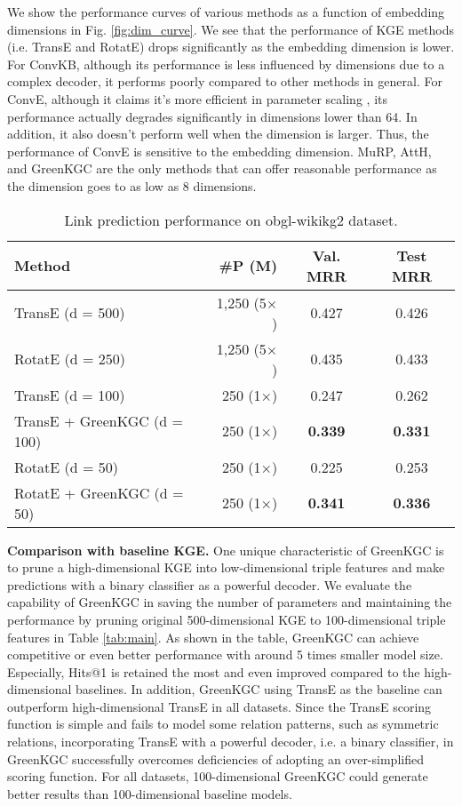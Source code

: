 \documentclass{article}
\begin{document}
We show the performance curves of various methods as a function of
embedding dimensions in Fig. \ref{fig:dim_curve}. We see that the
performance of KGE methods (i.e. TransE and RotatE) drops significantly 
as the embedding dimension is lower. For ConvKB, although its
performance is less influenced by dimensions due to a complex decoder, 
it performs poorly compared to other methods in general. For ConvE, although
it claims it's more efficient in parameter scaling 
\citep{dettmers2018convolutional}, its performance actually degrades 
significantly in dimensions lower than 64. In addition, it also doesn't
perform well when the dimension is larger. Thus, the performance of ConvE is 
sensitive to the embedding dimension. 
MuRP, AttH, and GreenKGC are the only methods that can offer 
reasonable performance as the dimension goes to as low as 8 dimensions. 

\begin{table}[t]
\color{black}
\setlength\tabcolsep{3pt}
\centering
\begin{tabular}{l|r|c|c}
\hline
Method & \#P (M) & Val. MRR & Test MRR  \\
\hline
TransE (d = 500) & 1,250 (5$\times$) & 0.427 & 0.426  \\
RotatE (d = 250) & 1,250 (5$\times$) & 0.435 & 0.433  \\
\hline
TransE (d = 100) & 250 (1$\times$) & 0.247 & 0.262  \\
TransE + GreenKGC (d = 100) & 250 (1$\times$) & \textbf{0.339} & \textbf{0.331}  \\\hline
RotatE (d = 50)  & 250 (1$\times$) & 0.225 & 0.253  \\
RotatE + GreenKGC (d = 50)  & 250 (1$\times$) & \textbf{0.341} & \textbf{0.336} \\
\hline
\end{tabular}
\caption{Link prediction performance on obgl-wikikg2 dataset. }
\label{tab:ogbl}
\end{table}


\textbf{Comparison with baseline KGE.} One unique characteristic of
GreenKGC is to prune a high-dimensional KGE into low-dimensional triple
features and make predictions with a binary classifier as a powerful
decoder. We evaluate the capability of GreenKGC in saving the number of
parameters and maintaining the performance by pruning original 
500-dimensional KGE to 100-dimensional triple features in Table \ref{tab:main}. 
As shown in the table, GreenKGC can achieve competitive or even better 
performance with around 5 times smaller model size. Especially, Hits@1 is 
retained the most and even improved compared to the high-dimensional baselines. 
In addition, GreenKGC using TransE as the baseline can outperform 
high-dimensional TransE in all datasets. Since the 
TransE scoring function is simple and fails to model some relation patterns, such 
as symmetric relations, incorporating TransE with a powerful decoder, i.e. a 
binary classifier, in GreenKGC successfully overcomes deficiencies of adopting 
an over-simplified scoring function. 
For all datasets, 100-dimensional GreenKGC could generate better results than
100-dimensional baseline models.
\end{document}
